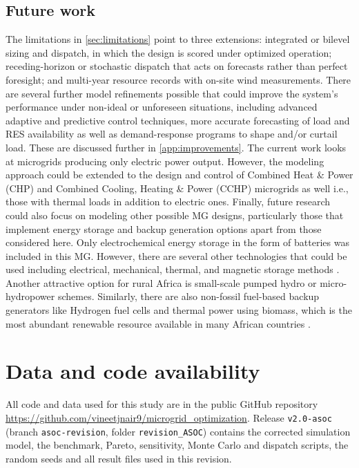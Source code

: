 \documentclass[final,3p,times]{elsarticle}
\begin{document}
\subsection{Future work \label{sec:future}}

The limitations in \cref{sec:limitations} point to three extensions: integrated or bilevel sizing and dispatch, in which the design is scored under optimized operation; receding-horizon or stochastic dispatch that acts on forecasts rather than perfect foresight; and multi-year resource records with on-site wind measurements. There are several further model refinements possible that could improve the system's performance under non-ideal or unforeseen situations, including advanced adaptive and predictive control techniques, more accurate forecasting of load and RES availability as well as demand-response programs to shape and/or curtail load. These are discussed further in \cref{app:improvements}. The current work looks at microgrids producing only electric power output. However, the modeling approach could be extended to the design and control of Combined Heat \& Power (CHP) and Combined Cooling, Heating \& Power (CCHP) microgrids as well i.e., those with thermal loads in addition to electric ones. Finally, future research could also focus on modeling other possible MG designs, particularly those that implement energy storage and backup generation options apart from those considered here. Only electrochemical energy storage in the form of batteries was included in this MG. However, there are several other technologies that could be used including electrical, mechanical, thermal, and magnetic storage methods \cite{ESS_control}. Another attractive option for rural Africa is small-scale pumped hydro or micro-hydropower schemes. Similarly, there are also non-fossil fuel-based backup generators like Hydrogen fuel cells and thermal power using biomass, which is the most abundant renewable resource available in many African countries \cite{usea}.

\section{Data and code availability}

All code and data used for this study are in the public GitHub repository \url{https://github.com/vineetjnair9/microgrid_optimization}. Release \texttt{v2.0-asoc} (branch \texttt{asoc-revision}, folder \texttt{revision\_ASOC}) contains the corrected simulation model, the benchmark, Pareto, sensitivity, Monte Carlo and dispatch scripts, the random seeds and all result files used in this revision.
\end{document}
